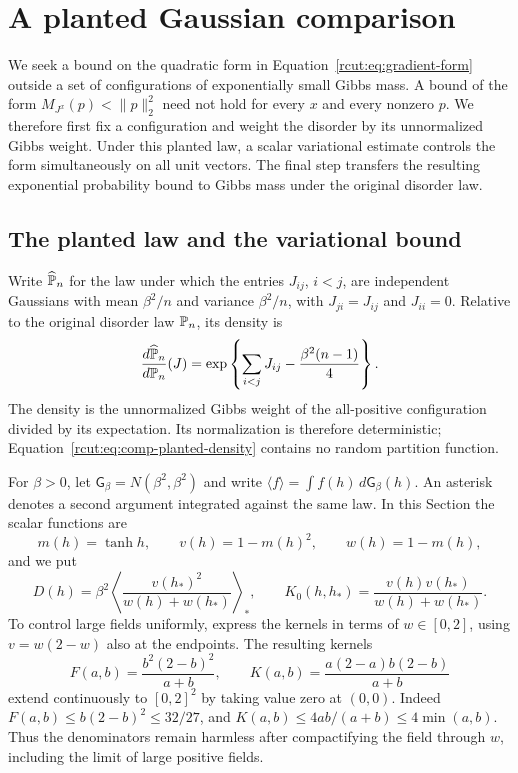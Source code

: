 \section{A planted Gaussian comparison}
\label{rcut:sec:comparison}

We seek a bound on the quadratic form in
Equation~\eqref{rcut:eq:gradient-form} outside a set of configurations
of exponentially small Gibbs mass.  A bound of the form
$M_{J^x}(p)<\|p\|_2^2$ need not hold for every $x$ and every nonzero
$p$.  We therefore first fix a configuration and weight the disorder
by its unnormalized Gibbs weight.  Under this planted law, a scalar
variational estimate controls the form simultaneously on all unit
vectors.  The final step transfers the resulting exponential probability
bound to Gibbs mass under the original disorder law.

\subsection{The planted law and the variational bound}

Write $\widehat\P_n$ for the law under which the entries $J_{ij}$,
$i<j$, are independent Gaussians with mean $\beta^2/n$ and variance
$\beta^2/n$, with $J_{ji}=J_{ij}$ and $J_{ii}=0$.
Relative to the original disorder law $\P_n$, its density is
\begin{equation}
 \frac{d\widehat\P_n}{d\P_n}(J)
 =\exp\left\{\sum_{i<j}J_{ij}-\frac{\beta^2(n-1)}4\right\}.
 \label{rcut:eq:comp-planted-density}
\end{equation}
The density is the unnormalized Gibbs weight of the all-positive
configuration divided by its expectation.  Its normalization is therefore
deterministic; Equation~\eqref{rcut:eq:comp-planted-density} contains no
random partition function.

For $\beta>0$, let $\mathsf G_\beta=N(\beta^2,\beta^2)$ and write
$\langle f\rangle=\int f(h)\,d\mathsf G_\beta(h)$.
An asterisk denotes a second argument integrated against the same law.
In this Section the scalar functions are
\begin{equation}
 m(h)=\tanh h,\qquad v(h)=1-m(h)^2,\qquad w(h)=1-m(h),
 \label{rcut:eq:comp-field-functions}
\end{equation}
and we put
\begin{equation}
 D(h)=\beta^2\left\langle
             \frac{v(h_*)^2}{w(h)+w(h_*)}\right\rangle_*,
 \qquad
 K_0(h,h_*)=\frac{v(h)v(h_*)}{w(h)+w(h_*)}.
 \label{rcut:eq:comp-kernels}
\end{equation}
To control large fields uniformly, express the kernels in terms of
$w\in[0,2]$, using $v=w(2-w)$ also at the endpoints.  The resulting
kernels
\begin{equation}
 F(a,b)=\frac{b^2(2-b)^2}{a+b},\qquad
 K(a,b)=\frac{a(2-a)b(2-b)}{a+b}
 \label{rcut:eq:comp-compact-kernels}
\end{equation}
extend continuously to $[0,2]^2$ by taking value zero at $(0,0)$.
Indeed $F(a,b)\le b(2-b)^2\le32/27$, and
$K(a,b)\le4ab/(a+b)\le4\min(a,b)$.
Thus the denominators remain harmless after compactifying the field
through $w$, including the limit of large positive fields.

